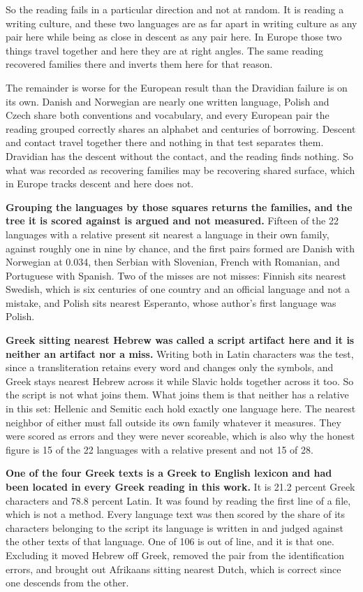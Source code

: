 So the reading fails in a particular direction and not at random. It is reading a writing culture, and these two languages are as far apart in writing culture as any pair here while being as close in descent as any pair here. In Europe those two things travel together and here they are at right angles. The same reading recovered families there and inverts them here for that reason.

The remainder is worse for the European result than the Dravidian failure is on its own. Danish and Norwegian are nearly one written language, Polish and Czech share both conventions and vocabulary, and every European pair the reading grouped correctly shares an alphabet and centuries of borrowing. Descent and contact travel together there and nothing in that test separates them. Dravidian has the descent without the contact, and the reading finds nothing. So what was recorded as recovering families may be recovering shared surface, which in Europe tracks descent and here does not.

\textbf{Grouping the languages by those squares returns the families, and the tree it is scored against is argued and not measured.} Fifteen of the 22 languages with a relative present sit nearest a language in their own family, against roughly one in nine by chance, and the first pairs formed are Danish with Norwegian at 0.034, then Serbian with Slovenian, French with Romanian, and Portuguese with Spanish. Two of the misses are not misses: Finnish sits nearest Swedish, which is six centuries of one country and an official language and not a mistake, and Polish sits nearest Esperanto, whose author's first language was Polish.

\textbf{Greek sitting nearest Hebrew was called a script artifact here and it is neither an artifact nor a miss.} Writing both in Latin characters was the test, since a transliteration retains every word and changes only the symbols, and Greek stays nearest Hebrew across it while Slavic holds together across it too. So the script is not what joins them. What joins them is that neither has a relative in this set: Hellenic and Semitic each hold exactly one language here. The nearest neighbor of either must fall outside its own family whatever it measures. They were scored as errors and they were never scoreable, which is also why the honest figure is 15 of the 22 languages with a relative present and not 15 of 28.

\textbf{One of the four Greek texts is a Greek to English lexicon and had been located in every Greek reading in this work.} It is 21.2 percent Greek characters and 78.8 percent Latin. It was found by reading the first line of a file, which is not a method. Every language text was then scored by the share of its characters belonging to the script its language is written in and judged against the other texts of that language. One of 106 is out of line, and it is that one. Excluding it moved Hebrew off Greek, removed the pair from the identification errors, and brought out Afrikaans sitting nearest Dutch, which is correct since one descends from the other.


